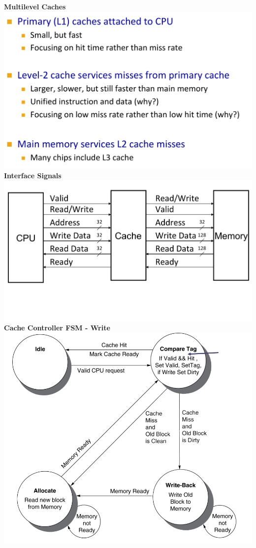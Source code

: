 \vfill\null
\columnbreak

\textbf{Multilevel Caches}\\
\includegraphics[width=\linewidth]{png/multi.png}
\textbf{Interface Signals}\\
\includegraphics[width=\linewidth]{png/diagram.png}
\textbf{Cache Controller FSM - Write}\\
\includegraphics[width=\linewidth]{png/fsm.png}
